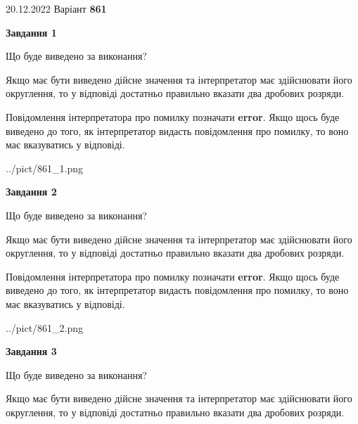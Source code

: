 \documentclass[12pt, ukrainian]{article}
\begin{document}
{20.12.2022 Варіант \No \textbf { 861 }\par}
{
\begin {Large}

{\begin {center}\textbf{Завдання 1}\end {center}}\par
Що буде виведено за виконання? \par

Якщо має бути виведено дійсне значення та інтерпретатор має здійснювати його округлення, 
то у відповіді достатньо правильно вказати два дробових розряди.

Повідомлення інтерпретатора про помилку позначати \textbf{error}.
Якщо щось буде виведено до того, як інтерпретатор видасть повідомлення про помилку, 
то воно має вказуватись у відповіді. \par

\begin{center}
	{../pict/861_1.png}
\end{center}
\newpage

{\begin {center}\textbf{Завдання 2}\end {center}}\par
Що буде виведено за виконання? \par

Якщо має бути виведено дійсне значення та інтерпретатор має здійснювати його округлення, 
то у відповіді достатньо правильно вказати два дробових розряди.

Повідомлення інтерпретатора про помилку позначати \textbf{error}.
Якщо щось буде виведено до того, як інтерпретатор видасть повідомлення про помилку, 
то воно має вказуватись у відповіді. \par

\begin{center}
	{../pict/861_2.png}
\end{center}
\newpage

{\begin {center}\textbf{Завдання 3}\end {center}}\par
Що буде виведено за виконання? \par

Якщо має бути виведено дійсне значення та інтерпретатор має здійснювати його округлення, 
то у відповіді достатньо правильно вказати два дробових розряди.


\end{Large}}
\end{document}
